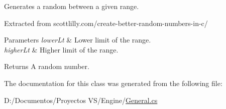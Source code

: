 Generates a random between a given range. 

Extracted from scottlilly.\+com/create-\/better-\/random-\/numbers-\/in-\/c/ 


\begin{DoxyParams}{Parameters}
{\em lower\+Lt} & Lower limit of the range.\\
\hline
{\em higher\+Lt} & Higher limit of the range.\\
\hline
\end{DoxyParams}
\begin{DoxyReturn}{Returns}
A random number.
\end{DoxyReturn}


The documentation for this class was generated from the following file\+:\begin{DoxyCompactItemize}
\item 
D\+:/\+Documentos/\+Proyectos V\+S/\+Engine/\mbox{\hyperlink{_general_8cs}{General.\+cs}}\end{DoxyCompactItemize}
